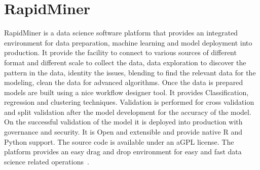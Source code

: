 \section{RapidMiner}

RapidMiner is a data science software platform that provides an 
integrated environment for data preparation, machine 
learning and model deployment into production.
It provide the facility to connect to various sources of different 
format and different scale to collect the data, data exploration to 
discover the pattern in the data, identity the issues, blending to 
find the relevant data for the modeling, clean the data for advanced 
algorithms. Once the data is prepared models are built using a nice 
workflow designer tool. It provides Classification, regression and 
clustering techniques. Validation is performed for cross validation 
and split validation after the model development for the accuracy of 
the model. On the successful validation of the model it is deployed 
into production with governance and security. It is Open and 
extensible and provide native R and Python support. The source code is
available under an aGPL license. The platform provides an easy drag 
and drop environment for easy and fast data science related 
operations~\cite{hid-sp18-511-rapidminer}.

